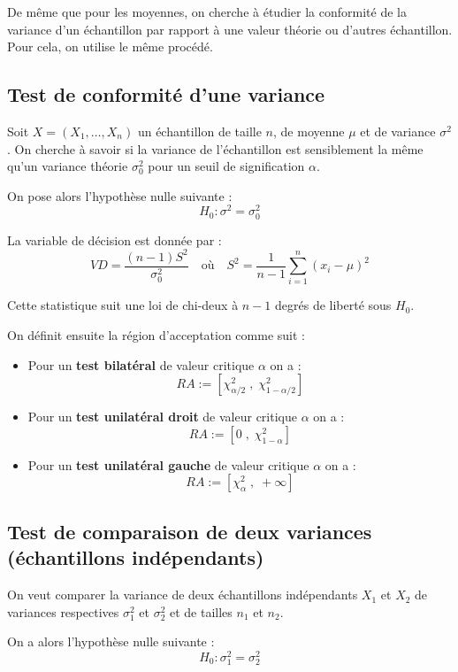 De même que pour les moyennes, on cherche à étudier la conformité de la variance d'un échantillon par rapport à 
une valeur théorie ou d'autres échantillon. Pour cela, on utilise le même procédé. 

\subsection{Test de conformité d'une variance}

Soit $X = (X_1, \dots, X_n)$ un échantillon de taille $n$, de moyenne $\mu$ et de variance $\sigma^2$. 
On cherche à savoir si la variance de l'échantillon est sensiblement la même qu'un variance théorie $\sigma_0^2$ pour 
un seuil de signification $\alpha$. 

On pose alors l'hypothèse nulle suivante :
    \[ H_0 : \sigma^2 = \sigma_0^2 \] 

La variable de décision est donnée par : 
    \[ VD = \frac{(n-1) S^2}{\sigma_0^2} \quad \text{où} \quad S^2 = \frac{1}{n-1} \sum_{i=1}^{n} (x_i - \mu)^2 \] 

Cette statistique suit une loi de chi-deux à $n-1$ degrés de liberté sous $H_0$. 

On définit ensuite la région d'acceptation comme suit :
\begin{itemize}
    \item Pour un \textbf{test bilatéral} de valeur critique $\alpha$ on a :
        \[ RA := [\chi_{\alpha/2}^2 \; , \; \chi_{1 - \alpha/2}^2 ] \] 
    \item Pour un \textbf{test unilatéral droit} de valeur critique $\alpha$ on a : 
        \[ RA := [0 \; , \; \chi_{1 - \alpha}^2] \] 
    \item Pour un \textbf{test unilatéral gauche} de valeur critique $\alpha$ on a :
        \[ RA := [\chi_\alpha^2 \; , \; + \infty ] \] 
\end{itemize}



\subsection{Test de comparaison de deux variances (échantillons indépendants)}

On veut comparer la variance de deux échantillons indépendants $X_1$ et $X_2$ de variances respectives $\sigma_1^2$ et $\sigma_2^2$
et de tailles $n_1$ et $n_2$. 

On a alors l'hypothèse nulle suivante : 
    \[ H_0 : \sigma_1^2 = \sigma_2^2 \] 

